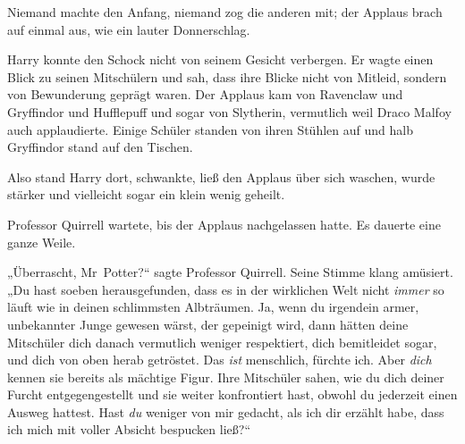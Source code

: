 Niemand machte den Anfang, niemand zog die anderen mit; der Applaus brach auf einmal aus, wie ein lauter Donnerschlag.

Harry konnte den Schock nicht von seinem Gesicht verbergen. Er wagte einen Blick zu seinen Mitschülern und sah, dass ihre Blicke nicht von Mitleid, sondern von Bewunderung geprägt waren. Der Applaus kam von Ravenclaw und Gryffindor und Hufflepuff und sogar von Slytherin, vermutlich weil Draco Malfoy auch applaudierte. Einige Schüler standen von ihren Stühlen auf und halb Gryffindor stand auf den Tischen.

Also stand Harry dort, schwankte, ließ den Applaus über sich waschen, wurde stärker und vielleicht sogar ein klein wenig geheilt.

Professor Quirrell wartete, bis der Applaus nachgelassen hatte. Es dauerte eine ganze Weile.

„Überrascht, Mr~Potter?“ sagte Professor Quirrell. Seine Stimme klang amüsiert.
„Du hast soeben herausgefunden, dass es in der wirklichen Welt nicht \emph{immer} so läuft wie in deinen schlimmsten Albträumen. Ja, wenn du irgendein armer, unbekannter Junge gewesen wärst, der gepeinigt wird, dann hätten deine Mitschüler dich danach vermutlich weniger respektiert, dich bemitleidet sogar, und dich von oben herab getröstet. Das \emph{ist} menschlich, fürchte ich. Aber \emph{dich} kennen sie bereits als mächtige Figur. Ihre Mitschüler sahen, wie du dich deiner Furcht entgegengestellt und sie weiter konfrontiert hast, obwohl du jederzeit einen Ausweg hattest. Hast \emph{du} weniger von mir gedacht, als ich dir erzählt habe, dass ich mich mit voller Absicht bespucken ließ?“

